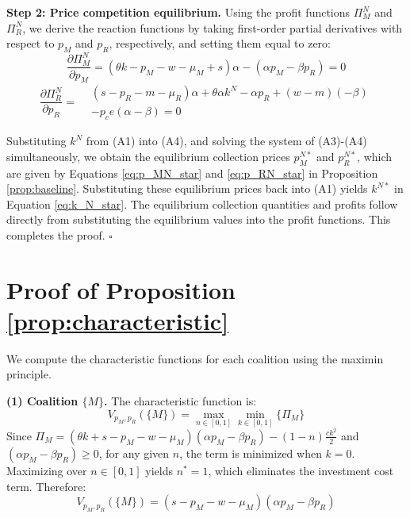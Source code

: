 \documentclass[authoryear,preprint,review,times,10pt]{elsarticle}
\begin{document}
\textbf{Step 2: Price competition equilibrium.} Using the profit functions $\Pi_M^N$ and $\Pi_R^N$, we derive the reaction functions by taking first-order partial derivatives with respect to $p_M$ and $p_R$, respectively, and setting them equal to zero:
\begin{equation}
\frac{\partial \Pi_M^N}{\partial p_M} = (\theta k - p_M - w - \mu_M + s)\alpha - (\alpha p_M - \beta p_R) = 0
\tag{A3}
\end{equation}
\begin{equation}
\frac{\partial \Pi_R^N}{\partial p_R} =
\begin{aligned}
& (s - p_R - m - \mu_R)\alpha + \theta\alpha k^N - \alpha p_R + (w - m)(-\beta) \\
& - p_c e (\alpha - \beta) = 0
\end{aligned}
\tag{A4}
\end{equation}

Substituting $k^N$ from (A1) into (A4), and solving the system of (A3)-(A4) simultaneously, we obtain the equilibrium collection prices $p_M^{N*}$ and $p_R^{N*}$, which are given by Equations \eqref{eq:p_MN_star} and \eqref{eq:p_RN_star} in Proposition \ref{prop:baseline}. Substituting these equilibrium prices back into (A1) yields $k^{N*}$ in Equation \eqref{eq:k_N_star}. The equilibrium collection quantities and profits follow directly from substituting the equilibrium values into the profit functions. This completes the proof. \hfill $\square$

\section{Proof of Proposition \ref{prop:characteristic}}
\label{app:prop2}

We compute the characteristic functions for each coalition using the maximin principle.

\textbf{(1) Coalition $\{M\}$.} The characteristic function is:
\begin{equation}
V_{p_M,p_R}(\{M\}) = \max_{n \in [0,1]} \min_{k \in [0,1]} \{\Pi_M\}
\end{equation}
Since $\Pi_M = (\theta k + s - p_M - w - \mu_M)(\alpha p_M - \beta p_R) - (1 - n)\frac{ck^2}{2}$ and $(\alpha p_M - \beta p_R) \geq 0$, for any given $n$, the term is minimized when $k = 0$. Maximizing over $n \in [0,1]$ yields $n^* = 1$, which eliminates the investment cost term. Therefore:
\begin{equation}
V_{p_M,p_R}(\{M\}) = (s - p_M - w - \mu_M)(\alpha p_M - \beta p_R)
\tag{B1}
\end{equation}
\end{document}
